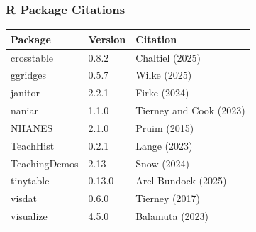 \documentclass[
  letterpaper,
  DIV=11,
  numbers=noendperiod,
  oneside]{scrartcl}
\begin{document}
\subsubsection{\texorpdfstring{ R Package
Citations}{ R Package Citations}}\label{r-package-citations}

\begin{longtable}[]{@{}lll@{}}
\toprule\noalign{}
Package & Version & Citation \\
\midrule\noalign{}
\endhead
\bottomrule\noalign{}
\endlastfoot
crosstable & 0.8.2 & Chaltiel (2025) \\
ggridges & 0.5.7 & Wilke (2025) \\
janitor & 2.2.1 & Firke (2024) \\
naniar & 1.1.0 & Tierney and Cook (2023) \\
NHANES & 2.1.0 & Pruim (2015) \\
TeachHist & 0.2.1 & Lange (2023) \\
TeachingDemos & 2.13 & Snow (2024) \\
tinytable & 0.13.0 & Arel-Bundock (2025) \\
visdat & 0.6.0 & Tierney (2017) \\
visualize & 4.5.0 & Balamuta (2023) \\
\end{longtable}
\end{document}
